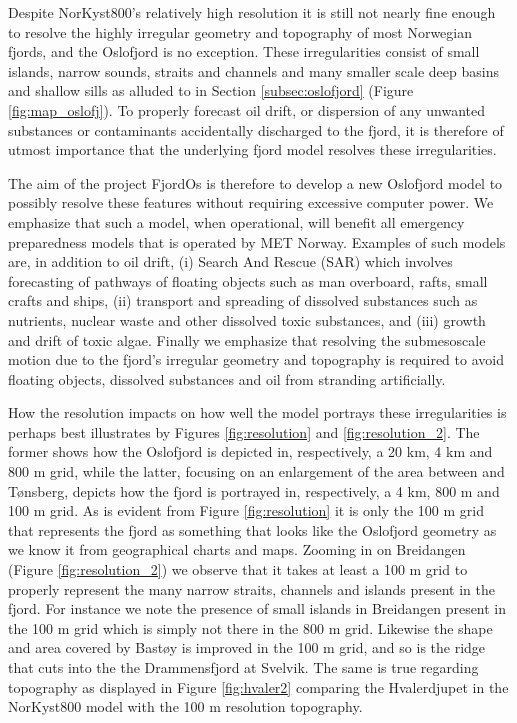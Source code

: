 Despite NorKyst800's relatively high resolution it is still not nearly fine enough to resolve the highly irregular geometry and topography of most Norwegian fjords, and the Oslofjord is no exception. These irregularities consist of small islands, narrow sounds, straits and channels and many smaller scale deep basins and shallow sills as alluded to in Section \ref{subsec:oslofjord} (Figure \ref{fig:map_oslofj}). To properly forecast oil drift, or dispersion of any unwanted substances or contaminants accidentally discharged to the fjord, it is therefore of utmost importance that the underlying fjord model resolves these irregularities. 

The aim of the project FjordOs is therefore to develop a new Oslofjord model to possibly resolve these features without requiring excessive computer power. We emphasize that such a model, when operational, will benefit all emergency preparedness models that is operated by MET Norway. Examples of such models are, in addition to oil drift, (i) Search And Rescue (SAR) which involves forecasting of pathways of floating objects such as man overboard, rafts, small crafts and ships, (ii) transport and spreading of dissolved substances such as nutrients, nuclear waste and other dissolved toxic substances, and (iii) growth and drift of toxic algae. Finally we emphasize that resolving the submesoscale motion due to the fjord's irregular geometry and topography is required to avoid floating objects, dissolved substances and oil from stranding artificially.  

How the resolution impacts on how well the model portrays these irregularities is perhaps best illustrates by Figures \ref{fig:resolution} and \ref{fig:resolution_2}. The former shows how the Oslofjord is depicted in, respectively, a 20 km, 4 km and 800 m grid, while the latter, focusing on an enlargement of the area between {\DR} and T{\o}nsberg, depicts how the fjord is portrayed in, respectively, a 4 km, 800 m and 100 m grid. As is evident from Figure \ref{fig:resolution} it is only the 100 m grid that represents the fjord as something that looks like the Oslofjord geometry as we know it from geographical charts and maps. Zooming in on Breidangen (Figure \ref{fig:resolution_2}) we observe that it takes at least a 100 m grid to properly represent the many narrow straits, channels and islands present in the fjord. For instance we note the presence of small islands in Breidangen present in the 100 m grid which is simply not there in the 800 m grid. Likewise the shape and area covered by Bast{\o}y is improved in the 100 m grid, and so is the ridge that cuts into the the Drammensfjord at Svelvik. The same is true regarding topography as displayed in Figure \ref{fig:hvaler2} comparing the Hvalerdjupet in the NorKyst800 model with the 100 m resolution topography. 


